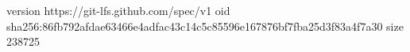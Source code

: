 version https://git-lfs.github.com/spec/v1
oid sha256:86fb792afdae63466e4adfac43c14c5c85596e167876bf7fba25d3f83a4f7a30
size 238725
